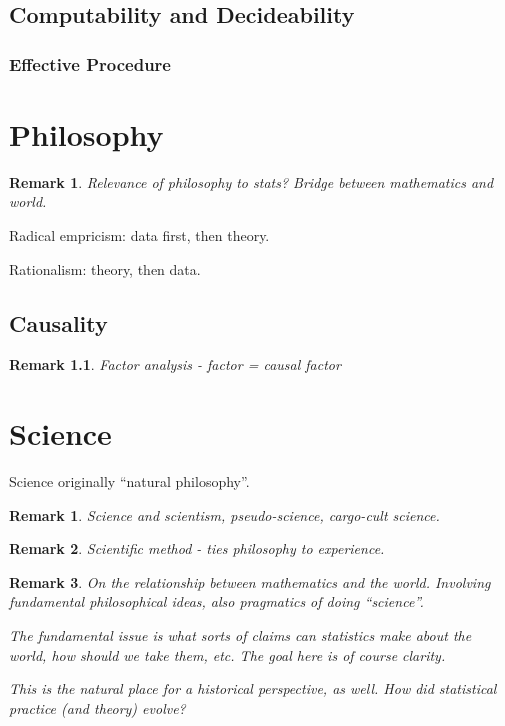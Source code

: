 \documentclass[reqno,12pt]{tufte-book}
\numberwithin{equation}{subsection}
\newtheorem{remark}{Remark}
\begin{document}
\chapter{Computability and Decideability}

\section{Effective Procedure}



\part{Philosophy}

\begin{remark}
  Relevance of philosophy to stats?  Bridge between mathematics and world.
\end{remark}

Radical empricism: data first, then theory.

Rationalism: theory, then data.

\chapter{Causality}

\begin{remark}
  Factor analysis - factor = causal factor
\end{remark}

\part{Science}

Science originally ``natural philosophy''.

\begin{remark}
  Science and scientism, pseudo-science, cargo-cult science.
\end{remark}

\begin{remark}
  Scientific method - ties philosophy to experience.
\end{remark}

\begin{remark}
  On the relationship between mathematics and the world.  Involving
  fundamental philosophical ideas, also pragmatics of \textit{doing}
  ``science''.

  The fundamental issue is what sorts of claims can statistics make
  about the world, how should we take them, etc.  The goal here is of
  course clarity.

  This is the natural place for a historical perspective, as well.
  How did statistical practice (and theory) evolve?
\end{remark}
\end{document}
